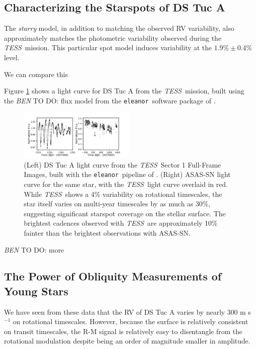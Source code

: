 \documentclass[twocolumn]{aastex63}
\newcommand{\tess}{{\it TESS}}
\newcommand{\eleanor}{\texttt{eleanor}}
\newcommand{\todo}[3]{{\color{#2} \emph{#1} TO DO: #3}}
\newcommand{\btmtodo}[1]{\todo{BEN}{blue}{#1}}
\begin{document}
\subsection{Characterizing the Starspots of DS Tuc A}
The \textit{starry} model, in addition to matching the observed RV variability, also approximately matches the photometric variability observed during the \tess\ mission. 
This particular spot model induces variability at the $1.9\% \pm 0.4\%$ level.

We can compare this 


Figure \ref{fig:lc_data} shows a light curve for DS Tuc A from the \tess\ mission, built using the \btmtodo{flux} model from the \eleanor\ software package of \citet{Feinstein19}.

\begin{figure}[!tbh]
  \begin{center}
    \includegraphics[width=0.5\textwidth, trim={0cm 0.0cm 0cm 0cm}, clip=true]{../figures/lcs.pdf}
   \end{center}
  \caption{(Left) DS Tuc A light curve from the \tess\ Sector 1 Full-Frame Images, built with the \eleanor\ pipeline of \citet{Feinstein19}. (Right) ASAS-SN light curve for the same star, with the \tess\ light curve overlaid in red. While \tess\ shows a 4\% variability on rotational timescales, the star itself varies on multi-year timescales by as much as 30\%, suggesting significant starspot coverage on the stellar surface. The brightest cadences observed with \tess\ are approximately 10\% fainter than the brightest observations with ASAS-SN.}
  \label{fig:lc_data}
\end{figure}

\btmtodo{more}


\subsection{The Power of Obliquity Measurements of Young Stars}

We have seen from these data that the RV of DS Tuc A varies by nearly 300 m s$^{-1}$ on rotational timescales. 
However, because the surface is relatively consistent on transit timescales, the R-M signal is relatively easy to disentangle from the rotational modulation despite being an order of magnitude smaller in amplitude.
\end{document}
